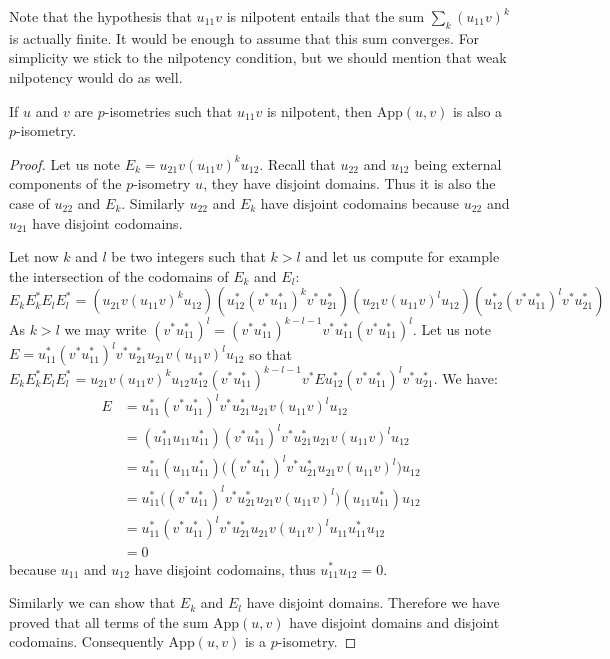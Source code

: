 Note that the hypothesis that \(u_{11}v\) is nilpotent entails that the
sum \(\sum_k(u_{11}v)^k\) is actually finite. It would be enough to
assume that this sum converges. For simplicity we stick to the
nilpotency condition, but we should mention that weak nilpotency would
do as well.

\begin{theorem}
If $u$ and $v$ are $p$-isometries such that $u_{11}v$ is nilpotent, then $\mathrm{App}(u,v)$ is also a $p$-isometry.
\end{theorem}

\begin{proof}
Let us note $E_k = u_{21}v(u_{11}v)^ku_{12}$. Recall that $u_{22}$ and $u_{12}$ being external components of the $p$-isometry $u$, they have disjoint domains. Thus it is also the case of $u_{22}$ and $E_k$. Similarly $u_{22}$ and $E_k$ have disjoint codomains because $u_{22}$ and $u_{21}$ have disjoint codomains.

Let now $k$ and $l$ be two integers such that $k>l$ and let us compute for example the intersection of the codomains of $E_k$ and $E_l$:
\begin{equation*}
    E_kE^*_kE_lE^*_l = (u_{21}v(u_{11}v)^ku_{12})(u^*_{12}(v^*u^*_{11})^kv^*u^*_{21})(u_{21}v(u_{11}v)^lu_{12})(u^*_{12}(v^*u^*_{11})^lv^*u_{21}^*)
\end{equation*}
  As $k>l$ we may write $(v^*u_{11}^*)^l = (v^*u^*_{11})^{k-l-1}v^*u^*_{11}(v^*u^*_{11})^l$. Let us note $E = u^*_{11}(v^*u^*_{11})^lv^*u_{21}^*u_{21}v(u_{11}v)^lu_{12}$ so that $E_kE^*_kE_lE^*_l = u_{21}v(u_{11}v)^ku_{12}u^*_{12}(v^*u^*_{11})^{k-l-1}v^*Eu^*_{12}(v^*u^*_{11})^lv^*u_{21}^*$. We have:
\begin{align*}
     E & = u^*_{11}(v^*u^*_{11})^lv^*u_{21}^*u_{21}v(u_{11}v)^lu_{12}\\
       & = (u^*_{11}u_{11}u^*_{11})(v^*u^*_{11})^lv^*u_{21}^*u_{21}v(u_{11}v)^lu_{12}\\
       & = u^*_{11}(u_{11}u^*_{11})\bigl((v^*u^*_{11})^lv^*u_{21}^*u_{21}v(u_{11}v)^l\bigr)u_{12}\\
       & = u^*_{11}\bigl((v^*u^*_{11})^lv^*u_{21}^*u_{21}v(u_{11}v)^l\bigr)(u_{11}u^*_{11})u_{12}\\
       & = u^*_{11}(v^*u^*_{11})^lv^*u_{21}^*u_{21}v(u_{11}v)^lu_{11}u^*_{11}u_{12}\\
       & = 0
\end{align*}
because $u_{11}$ and $u_{12}$ have disjoint codomains, thus $u^*_{11}u_{12} = 0$. 

Similarly we can show that $E_k$ and $E_l$ have disjoint domains. Therefore we have proved that all terms of the sum $\mathrm{App}(u,v)$ have disjoint domains and disjoint codomains. Consequently $\mathrm{App}(u,v)$ is a $p$-isometry.
\end{proof}

